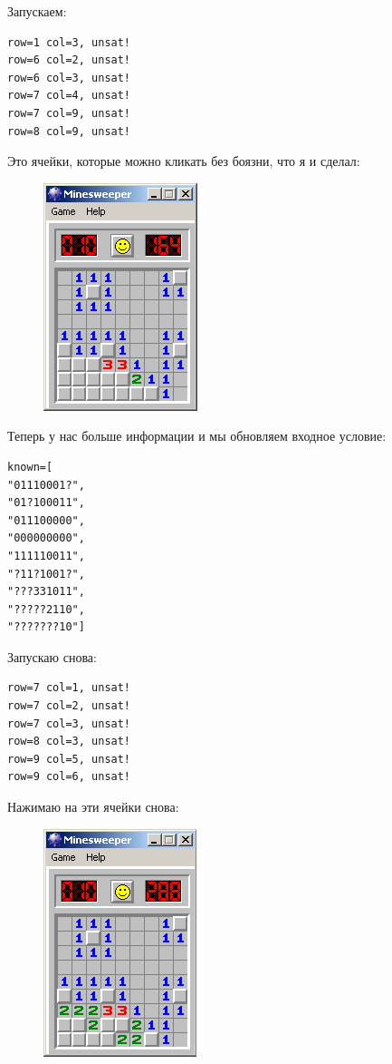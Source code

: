 Запускаем:

\begin{lstlisting}
row=1 col=3, unsat!
row=6 col=2, unsat!
row=6 col=3, unsat!
row=7 col=4, unsat!
row=7 col=9, unsat!
row=8 col=9, unsat!
\end{lstlisting}

Это ячейки, которые можно кликать без боязни, что я и сделал:

\begin{figure}[H]
\centering
\includegraphics[scale=0.75]{SMT/minesweeper/2.png}
\end{figure}

Теперь у нас больше информации и мы обновляем входное условие:

\begin{lstlisting}
known=[
"01110001?",
"01?100011",
"011100000",
"000000000",
"111110011",
"?11?1001?",
"???331011",
"?????2110",
"???????10"]
\end{lstlisting}

Запускаю снова:

\begin{lstlisting}
row=7 col=1, unsat!
row=7 col=2, unsat!
row=7 col=3, unsat!
row=8 col=3, unsat!
row=9 col=5, unsat!
row=9 col=6, unsat!
\end{lstlisting}

Нажимаю на эти ячейки снова:

\begin{figure}[H]
\centering
\includegraphics[scale=0.75]{SMT/minesweeper/3.png}
\end{figure}

